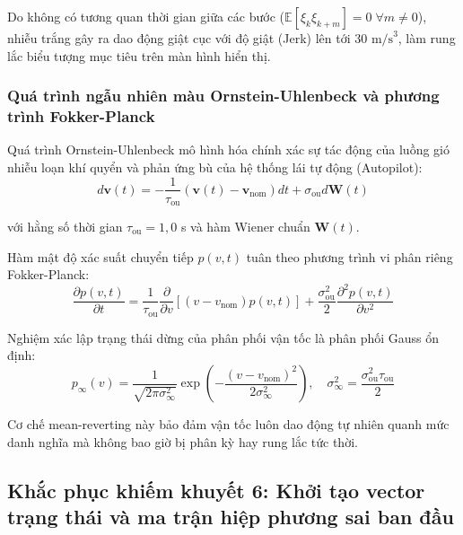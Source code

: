 Do không có tương quan thời gian giữa các bước ($\mathbb{E}[\xi_k \xi_{k+m}] = 0 \;\forall m \ne 0$), nhiễu trắng gây ra dao động giật cục với độ giật (Jerk) lên tới $30\text{ m/s}^3$, làm rung lắc biểu tượng mục tiêu trên màn hình hiển thị.

\subsubsection{Quá trình ngẫu nhiên màu Ornstein-Uhlenbeck và phương trình Fokker-Planck}

\hspace{0.5cm} Quá trình Ornstein-Uhlenbeck mô hình hóa chính xác sự tác động của luồng gió nhiễu loạn khí quyển và phản ứng bù của hệ thống lái tự động (Autopilot):
\begin{equation}
d\mathbf{v}(t) = -\frac{1}{\tau_{\text{ou}}} (\mathbf{v}(t) - \mathbf{v}_{\text{nom}}) dt + \sigma_{\text{ou}} d\mathbf{W}(t)
\label{eq:ou-stochastic-diff-eq}
\end{equation}

với hằng số thời gian $\tau_{\text{ou}} = 1{,}0$ s và hàm Wiener chuẩn $\mathbf{W}(t)$.

Hàm mật độ xác suất chuyển tiếp $p(v, t)$ tuân theo phương trình vi phân riêng Fokker-Planck:
\begin{equation}
\frac{\partial p(v, t)}{\partial t} = \frac{1}{\tau_{\text{ou}}} \frac{\partial}{\partial v}[(v - v_{\text{nom}}) p(v, t)] + \frac{\sigma_{\text{ou}}^2}{2} \frac{\partial^2 p(v, t)}{\partial v^2}
\label{eq:fokker-planck-ou-pde}
\end{equation}

Nghiệm xác lập trạng thái dừng của phân phối vận tốc là phân phối Gauss ổn định:
\begin{equation}
p_{\infty}(v) = \frac{1}{\sqrt{2\pi \sigma_{\infty}^2}} \exp\left( -\frac{(v - v_{\text{nom}})^2}{2\sigma_{\infty}^2} \right), \quad \sigma_{\infty}^2 = \frac{\sigma_{\text{ou}}^2 \tau_{\text{ou}}}{2}
\label{eq:steady-state-ou-variance}
\end{equation}

Cơ chế mean-reverting này bảo đảm vận tốc luôn dao động tự nhiên quanh mức danh nghĩa mà không bao giờ bị phân kỳ hay rung lắc tức thời.

\subsection{Khắc phục khiếm khuyết 6: Khởi tạo vector trạng thái và ma trận hiệp phương sai ban đầu}

